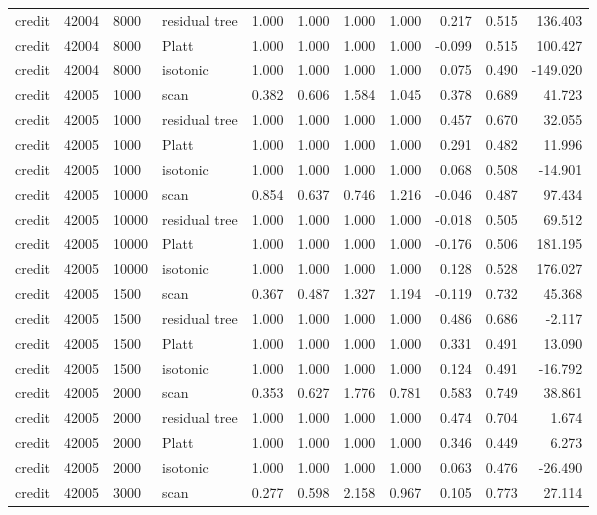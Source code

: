 \begin{tabular}{lrllrrrrrrr}
credit & 42004 & 8000 & residual tree & 1.000 & 1.000 & 1.000 & 1.000 & 0.217 & 0.515 & 136.403 \\
credit & 42004 & 8000 & Platt & 1.000 & 1.000 & 1.000 & 1.000 & -0.099 & 0.515 & 100.427 \\
credit & 42004 & 8000 & isotonic & 1.000 & 1.000 & 1.000 & 1.000 & 0.075 & 0.490 & -149.020 \\
credit & 42005 & 1000 & scan & 0.382 & 0.606 & 1.584 & 1.045 & 0.378 & 0.689 & 41.723 \\
credit & 42005 & 1000 & residual tree & 1.000 & 1.000 & 1.000 & 1.000 & 0.457 & 0.670 & 32.055 \\
credit & 42005 & 1000 & Platt & 1.000 & 1.000 & 1.000 & 1.000 & 0.291 & 0.482 & 11.996 \\
credit & 42005 & 1000 & isotonic & 1.000 & 1.000 & 1.000 & 1.000 & 0.068 & 0.508 & -14.901 \\
credit & 42005 & 10000 & scan & 0.854 & 0.637 & 0.746 & 1.216 & -0.046 & 0.487 & 97.434 \\
credit & 42005 & 10000 & residual tree & 1.000 & 1.000 & 1.000 & 1.000 & -0.018 & 0.505 & 69.512 \\
credit & 42005 & 10000 & Platt & 1.000 & 1.000 & 1.000 & 1.000 & -0.176 & 0.506 & 181.195 \\
credit & 42005 & 10000 & isotonic & 1.000 & 1.000 & 1.000 & 1.000 & 0.128 & 0.528 & 176.027 \\
credit & 42005 & 1500 & scan & 0.367 & 0.487 & 1.327 & 1.194 & -0.119 & 0.732 & 45.368 \\
credit & 42005 & 1500 & residual tree & 1.000 & 1.000 & 1.000 & 1.000 & 0.486 & 0.686 & -2.117 \\
credit & 42005 & 1500 & Platt & 1.000 & 1.000 & 1.000 & 1.000 & 0.331 & 0.491 & 13.090 \\
credit & 42005 & 1500 & isotonic & 1.000 & 1.000 & 1.000 & 1.000 & 0.124 & 0.491 & -16.792 \\
credit & 42005 & 2000 & scan & 0.353 & 0.627 & 1.776 & 0.781 & 0.583 & 0.749 & 38.861 \\
credit & 42005 & 2000 & residual tree & 1.000 & 1.000 & 1.000 & 1.000 & 0.474 & 0.704 & 1.674 \\
credit & 42005 & 2000 & Platt & 1.000 & 1.000 & 1.000 & 1.000 & 0.346 & 0.449 & 6.273 \\
credit & 42005 & 2000 & isotonic & 1.000 & 1.000 & 1.000 & 1.000 & 0.063 & 0.476 & -26.490 \\
credit & 42005 & 3000 & scan & 0.277 & 0.598 & 2.158 & 0.967 & 0.105 & 0.773 & 27.114 \\

\end{tabular}
